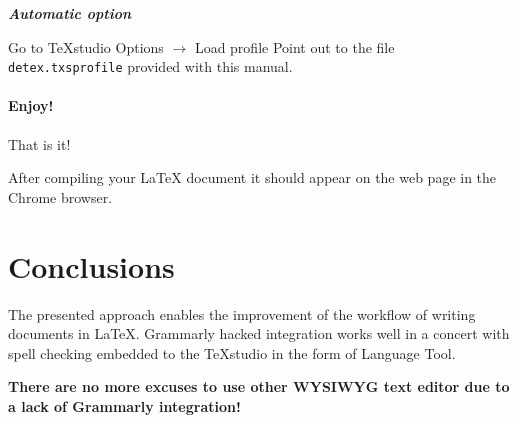\documentclass[]{spie}  %
\begin{document}
\noindent \textbf{\textit{Automatic option}}

Go to TeXstudio Options \(\rightarrow\) Load profile
Point out to the file \verb|detex.txsprofile| provided with this manual.

\paragraph{Enjoy!} That is it! 

After compiling your LaTeX document it should appear on the web page in the Chrome browser.

\section{Conclusions}
The presented approach enables the improvement of the workflow of writing documents in LaTeX. 
Grammarly hacked integration works well in a concert with spell checking embedded to the TeXstudio in the form of Language Tool.

\textbf{There are no more excuses to use other WYSIWYG text editor due to a lack of Grammarly integration!}
\end{document}
